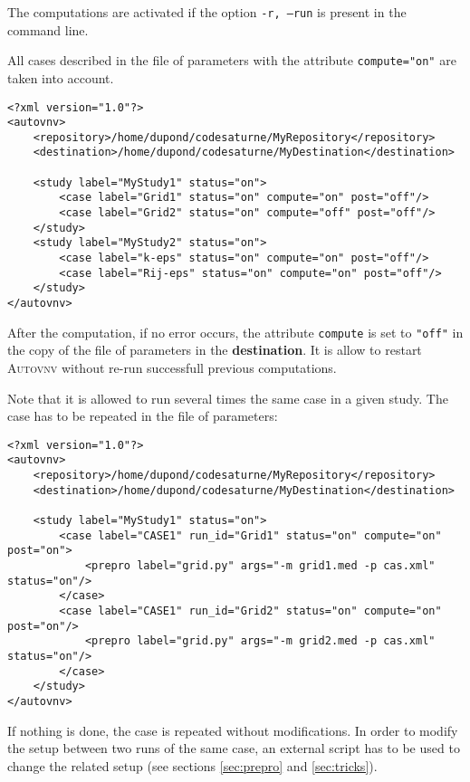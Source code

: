 \documentclass[a4paper,10pt,twoside]{csshortdoc}
\begin{document}
The computations are activated if the option \texttt{-r, --run} is present in
the command line.

All cases described in the file of parameters with the attribute
\texttt{compute="on"} are taken into account.

\small
\begin{verbatim}
<?xml version="1.0"?>
<autovnv>
    <repository>/home/dupond/codesaturne/MyRepository</repository>
    <destination>/home/dupond/codesaturne/MyDestination</destination>

    <study label="MyStudy1" status="on">
        <case label="Grid1" status="on" compute="on" post="off"/>
        <case label="Grid2" status="on" compute="off" post="off"/>
    </study>
    <study label="MyStudy2" status="on">
        <case label="k-eps" status="on" compute="on" post="off"/>
        <case label="Rij-eps" status="on" compute="on" post="off"/>
    </study>
</autovnv>
\end{verbatim}
\normalsize

After the computation, if no error occurs, the attribute \texttt{compute} is set
to \texttt{"off"} in the copy of the file of parameters in the
\textbf{destination}. It is allow to restart \textsc{Autovnv} without re-run
successfull previous computations.

Note that it is allowed to run several times the same case in a given study.
The case has to be repeated in the file of parameters:

\small
\begin{verbatim}
<?xml version="1.0"?>
<autovnv>
    <repository>/home/dupond/codesaturne/MyRepository</repository>
    <destination>/home/dupond/codesaturne/MyDestination</destination>

    <study label="MyStudy1" status="on">
        <case label="CASE1" run_id="Grid1" status="on" compute="on" post="on">
            <prepro label="grid.py" args="-m grid1.med -p cas.xml" status="on"/>
        </case>
        <case label="CASE1" run_id="Grid2" status="on" compute="on" post="on"/>
            <prepro label="grid.py" args="-m grid2.med -p cas.xml" status="on"/>
        </case>
    </study>
</autovnv>
\end{verbatim}
\normalsize

If nothing is done, the case is repeated without modifications. In order to modify
the setup between two runs of the same case, an external script has to be used to
change the related setup (see sections \ref{sec:prepro} and \ref{sec:tricks}).
\end{document}

